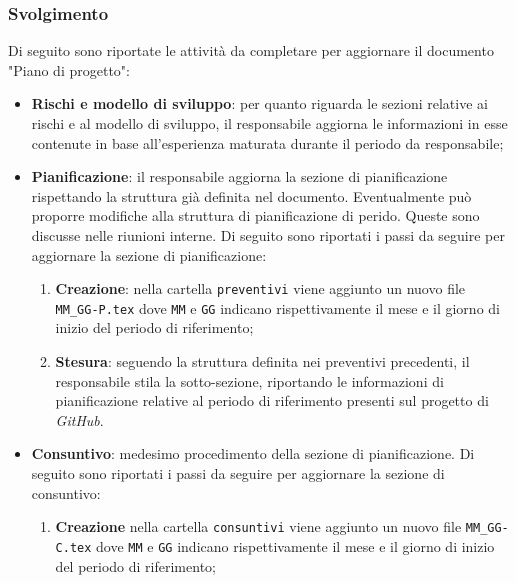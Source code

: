 \subsubsection{Svolgimento}
Di seguito sono riportate le attività da completare per aggiornare il documento
"Piano di progetto":
\begin{itemize}
	\item \textbf{Rischi e modello di sviluppo}: per quanto riguarda le sezioni
	      relative ai rischi e al modello di sviluppo, il responsabile aggiorna
	      le informazioni in esse contenute in base all'esperienza maturata
	      durante il periodo da responsabile;

	\item \textbf{Pianificazione}: il responsabile aggiorna la sezione di
	      pianificazione rispettando la struttura già definita nel documento.
	      Eventualmente può proporre modifiche alla struttura di pianificazione
	      di perido. Queste sono discusse nelle riunioni interne.
	      Di seguito sono riportati i passi da seguire per aggiornare la sezione
	      di pianificazione:
	      \begin{enumerate}
		      \item \textbf{Creazione}: nella cartella \texttt{preventivi} viene
		            aggiunto un nuovo file \texttt{MM\_GG-P.tex} dove
		            \texttt{MM} e \texttt{GG} indicano rispettivamente il mese e
		            il giorno di inizio del periodo di riferimento;

		      \item \textbf{Stesura}: seguendo la struttura definita nei
		            preventivi precedenti, il responsabile stila la
		            sotto-sezione, riportando le informazioni di pianificazione
		            relative al periodo di riferimento presenti sul progetto di
		            \textit{GitHub}.
	      \end{enumerate}

	\item \textbf{Consuntivo}: medesimo procedimento della sezione di
	      pianificazione. Di seguito sono riportati i passi da seguire per
	      aggiornare la sezione di consuntivo:
	      \begin{enumerate}
		      \item \textbf{Creazione} nella cartella \texttt{consuntivi} viene
		            aggiunto un nuovo file \texttt{MM\_GG-C.tex} dove
		            \texttt{MM} e \texttt{GG} indicano rispettivamente il mese e
		            il giorno di inizio del periodo di riferimento;


\end{enumerate}
\end{itemize}
